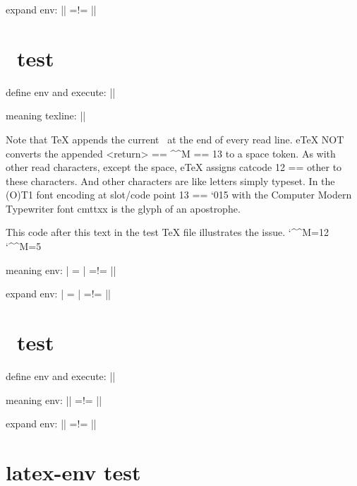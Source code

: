 expand env: |\env| =!= ||



\section{\string\readline\ test}

\let\myreadline\readline
\def\definer{%
    \readline\auxin to\texline%
}%

define env and execute: |\edef\env{%
    \string\endlinechar=\the\endlinechar%
    \execute{\definer}%
}|

meaning texline: |\meaning\texline|

Note that TeX appends the current \string\endlinechar\ at the end of every read line.
eTeX NOT converts the appended <return> == \string^\string^M == 13 to a space token.
As with other read characters, except the space, eTeX assigns catcode 12 == other to these characters.
And other characters are like letters simply typeset.
In the (O)T1 font encoding at slot/code point 13 == `015 with the Computer Modern Typewriter font cmttxx is the glyph of an apostrophe.

This code after this text in the test TeX file illustrates the issue.%
\catcode`\^^M=12 ^^M\catcode`\^^M=5 %

meaning env: |\meaning\env|  =!= |\meaning\empty|

expand env: |\env| =!= ||



\section{\string\closein\ test}

\let\myclosein\closein
\def\definer{%
    \closein\auxin%
}%

define env and execute: |\edef\env{\execute{\definer}}|

meaning env: |\meaning\env| =!= |\meaning\empty|

expand env: |\env| =!= ||



\section{latex-env test}



\def\todef{This is the FALSE text.}

